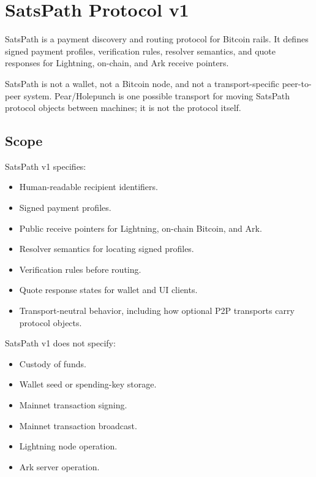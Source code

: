 \documentclass[
]{article}
\author{}
\date{}
\providecommand{\tightlist}{%
  \setlength{\itemsep}{0pt}\setlength{\parskip}{0pt}}
\begin{document}
\hypertarget{satspath-protocol-v1}{%
\section{SatsPath Protocol v1}\label{satspath-protocol-v1}}

SatsPath is a payment discovery and routing protocol for Bitcoin rails.
It defines signed payment profiles, verification rules, resolver
semantics, and quote responses for Lightning, on-chain, and Ark receive
pointers.

SatsPath is not a wallet, not a Bitcoin node, and not a
transport-specific peer-to-peer system. Pear/Holepunch is one possible
transport for moving SatsPath protocol objects between machines; it is
not the protocol itself.

\hypertarget{scope}{%
\subsection{Scope}\label{scope}}

SatsPath v1 specifies:

\begin{itemize}
\tightlist
\item
  Human-readable recipient identifiers.
\item
  Signed payment profiles.
\item
  Public receive pointers for Lightning, on-chain Bitcoin, and Ark.
\item
  Resolver semantics for locating signed profiles.
\item
  Verification rules before routing.
\item
  Quote response states for wallet and UI clients.
\item
  Transport-neutral behavior, including how optional P2P transports
  carry protocol objects.
\end{itemize}

SatsPath v1 does not specify:

\begin{itemize}
\tightlist
\item
  Custody of funds.
\item
  Wallet seed or spending-key storage.
\item
  Mainnet transaction signing.
\item
  Mainnet transaction broadcast.
\item
  Lightning node operation.
\item
  Ark server operation.
\end{itemize}
\end{document}
